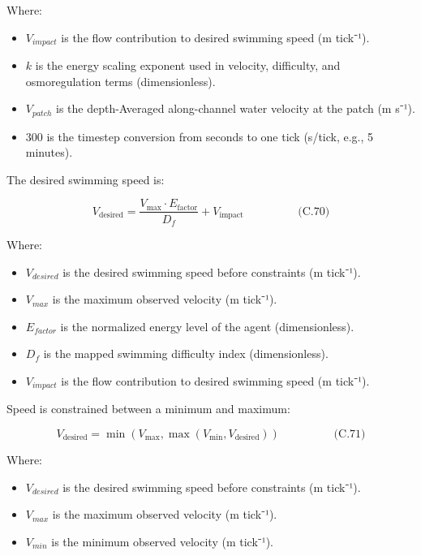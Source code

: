 \documentclass[
]{book}
\providecommand{\tightlist}{%
  \setlength{\itemsep}{0pt}\setlength{\parskip}{0pt}}
\begin{document}
Where:

\begin{itemize}
\tightlist
\item
  \(V_{impact}\) is the flow contribution to desired swimming speed (m
  tick⁻¹).
\item
  \(k\) is the energy scaling exponent used in velocity, difficulty, and
  osmoregulation terms (dimensionless).
\item
  \(V_{patch}\) is the depth-Averaged along-channel water velocity at
  the patch (m s⁻¹).
\item
  \(300\) is the timestep conversion from seconds to one tick (s/tick,
  e.g., 5 minutes).
\end{itemize}

The desired swimming speed is:

\[
\begin{equation} V_{\text{desired}} =
\frac{V_{\max} \cdot E_{\text{factor}}}{D_f}
+ V_{\text{impact}}  \hspace{2cm} \text{(C.70)} \end{equation}
\]

Where:

\begin{itemize}
\tightlist
\item
  \(V_{desired}\) is the desired swimming speed before constraints (m
  tick⁻¹).
\item
  \(V_{max}\) is the maximum observed velocity (m tick⁻¹).
\item
  \(E_{factor}\) is the normalized energy level of the agent
  (dimensionless).
\item
  \(D_f\) is the mapped swimming difficulty index (dimensionless).
\item
  \(V_{impact}\) is the flow contribution to desired swimming speed (m
  tick⁻¹).
\end{itemize}

Speed is constrained between a minimum and maximum:

\[
\begin{equation} V_{\text{desired}} 
= \min(V_{\max}, \max(V_{\min}, V_{\text{desired}}))  \hspace{2cm} \text{(C.71)} \end{equation}
\]

Where:

\begin{itemize}
\tightlist
\item
  \(V_{desired}\) is the desired swimming speed before constraints (m
  tick⁻¹).
\item
  \(V_{max}\) is the maximum observed velocity (m tick⁻¹).
\item
  \(V_{min}\) is the minimum observed velocity (m tick⁻¹).
\end{itemize}
\end{document}
